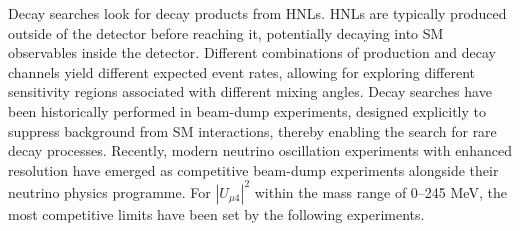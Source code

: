 Decay searches look for decay products from HNLs.
HNLs are typically produced outside of the detector before reaching it, potentially decaying into SM observables inside the detector.
Different combinations of production and decay channels yield different expected event rates, allowing for exploring different sensitivity regions associated with different mixing angles.
Decay searches have been historically performed in beam-dump experiments, designed explicitly to suppress background from SM interactions, thereby enabling the search for rare decay processes.
Recently, modern neutrino oscillation experiments with enhanced resolution have emerged as competitive beam-dump experiments alongside their neutrino physics programme.
For $|U_{\mu4}|^{2}$ within the mass range of 0--245 MeV, the most competitive limits have been set by the following experiments.

